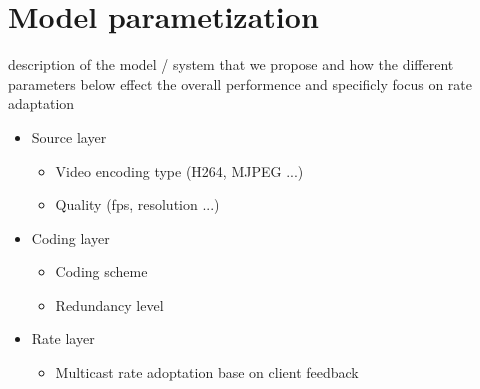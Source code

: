 \section{Model parametization}\label{sec:modelparam}
description of the model / system that we propose and how the different parameters below effect the overall performence and specificly focus on rate adaptation
\begin{itemize}
  \item Source layer
  \begin{itemize}
    \item Video encoding type (H264, MJPEG ...)
    \item Quality (fps, resolution ...)
  \end{itemize}
  \item Coding layer
    \begin{itemize}
      \item Coding scheme
      \item Redundancy level
    \end{itemize}
  \item Rate layer
  \begin{itemize}
    \item Multicast rate adoptation base on client feedback
  \end{itemize}
\end{itemize}
